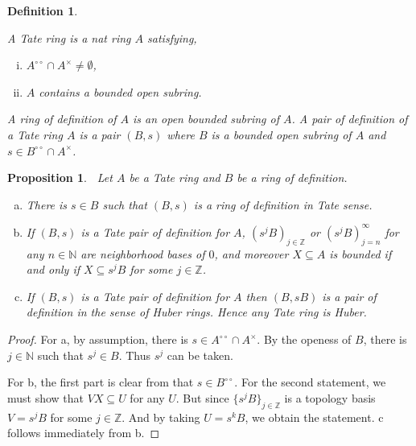 \documentclass[8pt]{article}
\numberwithin{equation}{section}
\newtheorem{proposition}{Proposition}[subsection]
\newtheorem{definition}{Definition}[subsection]
\newcommand{\N}[0]{\mathbb{N}}
\newcommand{\Z}[0]{\mathbb{Z}}
\newcommand{\dcirc}[0]{{\circ\circ}}
\begin{document}
\begin{definition}
    \label{definition_18_5}
    
    A Tate ring %
    is a nat ring $A$ satisfying,
    \begin{enumerate}[i.] 
        \item $A^\dcirc\cap A^\times\not=\emptyset$,
        \item $A$ contains a bounded open subring.
    \end{enumerate}
    A ring of definition of $A$ is an open bounded subring of $A$. A pair of definition of a Tate ring $A$ is a pair $(B,s)$ where $B$ is a bounded open subring of $A$ and $s\in B^{\dcirc}\cap A^\times$.%
\end{definition}

\begin{proposition}$\:$
    \label{fact_18_11}
    Let $A$ be a Tate ring and $B$ be a ring of definition. 
    \begin{enumerate}[a.]
        \item There is $s\in B$ such that $(B,s)$ is a ring of definition in Tate sense.%
        \item If $(B,s)$ is a Tate pair of definition for $A$, $(s^jB)_{j\in\Z}$ or $(s^jB)^{\infty}_{j=n}$ for any $n\in\N$ are neighborhood bases of $0$, and moreover $X\subseteq A$ is bounded if and only if $X\subseteq s^jB$ for some $j\in\Z$.
        \item If $(B,s)$ is a Tate pair of definition for $A$ then $(B,sB)$ is a pair of definition in the sense of Huber rings. Hence any Tate ring is Huber.
    \end{enumerate}
\end{proposition}

\begin{proof}
    For a, by assumption, there is $s\in A^\dcirc\cap A^\times$. By the openess of $B$, there is $j\in\N$ such that $s^j\in B$. Thus $s^j$ can be taken.
    \par For b, the first part is clear from that $s\in B^\dcirc$. For the second statement, we must show that $V X\subseteq U$ for any $U$. But since $\{s^jB\}_{j\in\Z}$ is a topology basis $V = s^jB$ for some $j\in\Z$. And by taking $U=s^kB$, we obtain the statement. c follows immediately from b.
\end{proof}
\end{document}
